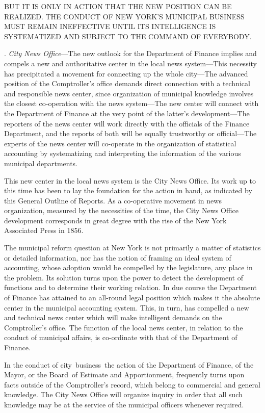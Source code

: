 \documentclass[openany,nobib]{tufte-book}
\begin{document}
BUT IT IS ONLY IN ACTION THAT THE NEW POSITION CAN BE REALIZED. THE
CONDUCT OF NEW YORK'S MUNICIPAL BUSINESS MUST REMAIN INEFFECTIVE UNTIL
ITS INTELLIGENCE IS SYSTEMATIZED AND SUBJECT TO THE COMMAND OF
EVERYBODY.~

\vspace{.15in}

. \emph{City News Office}---The new outlook for the Department of
Finance implies and compels a new and authoritative center in the local
news system---This necessity has precipitated a movement for connecting
up the whole city---The advanced position of the Comptroller's office
demands direct connection with a technical and responsible news center,
since organization of municipal knowledge involves the closest
co-operation with the news system---The new center will connect with the
Department of Finance at the very point of the latter's
development---The reporters of the news center will work directly with
the officials of the Finance Department, and the reports of both will be
equally trustworthy or official---The experts of the news center will
co-operate in the organization of statistical accounting by
systematizing and interpreting the information of the various municipal
departments.~

This new center in the local news system is the City News Office. Its
work up to this time has been to lay the foundation for the action in
hand, as indicated by this General Outline of Reports. As a co-operative
movement in news organization, measured by the necessities of the time,
the City News Office development corresponds in great degree with the
rise of the New York Associated Press in 1856.~~

The municipal reform question at New York is not primarily a matter of
statistics or detailed information, nor has the notion of framing an
ideal system of accounting, whose adoption would be compelled by the
legislature, any place in the problem. Its solution turns upon the power
to detect the development of functions and to determine their working
relation. In due course the Department of Finance has attained to an
all-round legal position which makes it the absolute center in the
municipal accounting system. This, in turn, has compelled a new and
technical news center which will make intelligent demands on the
Comptroller's office. The function of the local news center, in relation
to the conduct of municipal affairs, is co-ordinate with that of the
Department of Finance.~

In the conduct of city~business~the action of the Department of Finance,
of the Mayor, or the Board~of Estimate and Apportionment, frequently
turns upon facts outside of the Comptroller's record, which belong to
commercial and general knowledge. The City News Office will organize
inquiry in order that all such knowledge may be at the service of the
municipal officers whenever required.~
\end{document}
